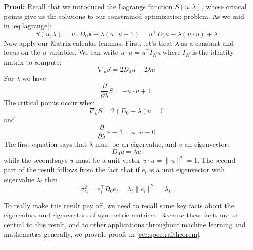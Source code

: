\documentclass[
]{article}
\begin{document}
\textbf{Proof:} Recall that we introduced the Lagrange function
\(S(u,\lambda)\), whose critical points give us the solutions to our
constrained optimization problem. As we said in \cref{eq:lagrange}: \[
S(u,\lambda) = u^{\intercal}D_{0}u - \lambda(u\cdot u - 1) = u^{\intercal}D_{0}u -\lambda(u\cdot u) + \lambda
\] Now apply our Matrix calculus lemmas. First, let's treat \(\lambda\)
as a constant and focus on the \(u\) variables. We can write
\(u\cdot u = u^{\intercal} I_{N} u\) where \(I_{N}\) is the identity
matrix to compute: \[
\nabla_{u} S = 2D_{0}u -2\lambda u
\] For \(\lambda\) we have \[
\frac{\partial}{\partial \lambda}S = -u\cdot u +1.
\] The critical points occur when \[
\nabla_{u} S = 2(D_{0}-\lambda)u = 0
\] and \[
\frac{\partial}{\partial \lambda}S = 1-u\cdot u = 0
\] The first equation says that \(\lambda\) must be an eigenvalue, and
\(u\) an eigenvector: \[
D_{0}u = \lambda u
\] while the second says \(u\) must be a unit vector
\(u\cdot u=\|u\|^2=1\). The second part of the result follows from the
fact that if \(e_{i}\) is a unit eigenvector with eigenvalue
\(\lambda_{i}\) then \[
\sigma_{e_{i}}^2 = e_{i}^{\intercal}D_{0}e_{i} = \lambda_{i}\|e_{i}\|^2=\lambda_{i}.
\]

To really make this result pay off, we need to recall some key facts
about the eigenvalues and eigenvectors of symmetric matrices. Because
these facts are so central to this result, and to other applications
throughout machine learning and mathematics generally, we provide proofs
in \cref{sec:spectraltheorem}.

\begin{center}\rule{0.5\linewidth}{0.5pt}\end{center}
\end{document}
